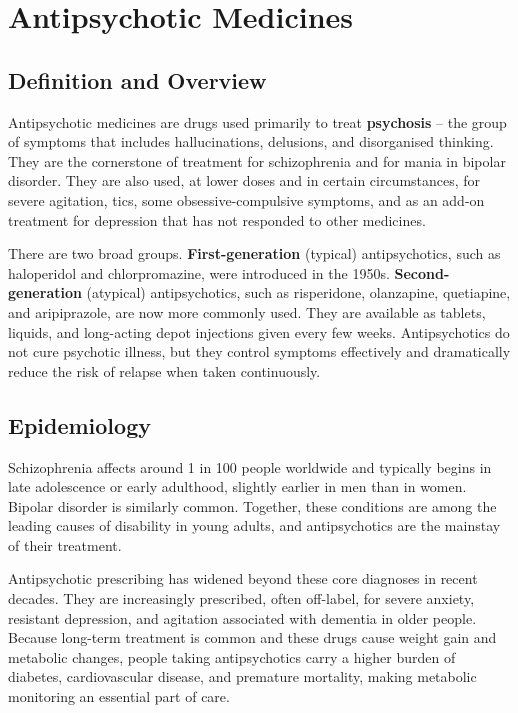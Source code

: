 \chapter{Antipsychotic Medicines}

\section*{Definition and Overview}
Antipsychotic medicines are drugs used primarily to treat \textbf{psychosis} -- the group of symptoms that includes hallucinations, delusions, and disorganised thinking. They are the cornerstone of treatment for schizophrenia and for mania in bipolar disorder. They are also used, at lower doses and in certain circumstances, for severe agitation, tics, some obsessive-compulsive symptoms, and as an add-on treatment for depression that has not responded to other medicines.

There are two broad groups. \textbf{First-generation} (typical) antipsychotics, such as haloperidol and chlorpromazine, were introduced in the 1950s. \textbf{Second-generation} (atypical) antipsychotics, such as risperidone, olanzapine, quetiapine, and aripiprazole, are now more commonly used. They are available as tablets, liquids, and long-acting depot injections given every few weeks. Antipsychotics do not cure psychotic illness, but they control symptoms effectively and dramatically reduce the risk of relapse when taken continuously.

\section*{Epidemiology}
Schizophrenia affects around 1 in 100 people worldwide and typically begins in late adolescence or early adulthood, slightly earlier in men than in women. Bipolar disorder is similarly common. Together, these conditions are among the leading causes of disability in young adults, and antipsychotics are the mainstay of their treatment.

Antipsychotic prescribing has widened beyond these core diagnoses in recent decades. They are increasingly prescribed, often off-label, for severe anxiety, resistant depression, and agitation associated with dementia in older people. Because long-term treatment is common and these drugs cause weight gain and metabolic changes, people taking antipsychotics carry a higher burden of diabetes, cardiovascular disease, and premature mortality, making metabolic monitoring an essential part of care.

